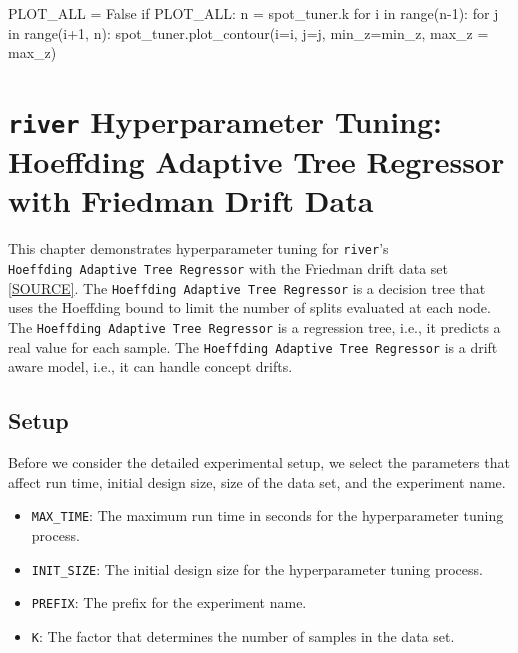\documentclass[
  letterpaper,
  DIV=11,
  numbers=noendperiod]{scrreprt}
\newenvironment{Shaded}{\begin{snugshade}}{\end{snugshade}}
\newcommand{\BuiltInTok}[1]{\textcolor[rgb]{0.00,0.23,0.31}{#1}}
\newcommand{\ControlFlowTok}[1]{\textcolor[rgb]{0.00,0.23,0.31}{#1}}
\newcommand{\DecValTok}[1]{\textcolor[rgb]{0.68,0.00,0.00}{#1}}
\newcommand{\KeywordTok}[1]{\textcolor[rgb]{0.00,0.23,0.31}{#1}}
\newcommand{\NormalTok}[1]{\textcolor[rgb]{0.00,0.23,0.31}{#1}}
\newcommand{\OperatorTok}[1]{\textcolor[rgb]{0.37,0.37,0.37}{#1}}
\newcommand{\VariableTok}[1]{\textcolor[rgb]{0.07,0.07,0.07}{#1}}
\providecommand{\tightlist}{%
  \setlength{\itemsep}{0pt}\setlength{\parskip}{0pt}}\usepackage{longtable,booktabs,array}
\begin{document}
\begin{Shaded}
\begin{Highlighting}[]
\NormalTok{PLOT\_ALL }\OperatorTok{=} \VariableTok{False}
\ControlFlowTok{if}\NormalTok{ PLOT\_ALL:}
\NormalTok{    n }\OperatorTok{=}\NormalTok{ spot\_tuner.k}
    \ControlFlowTok{for}\NormalTok{ i }\KeywordTok{in} \BuiltInTok{range}\NormalTok{(n}\OperatorTok{{-}}\DecValTok{1}\NormalTok{):}
        \ControlFlowTok{for}\NormalTok{ j }\KeywordTok{in} \BuiltInTok{range}\NormalTok{(i}\OperatorTok{+}\DecValTok{1}\NormalTok{, n):}
\NormalTok{            spot\_tuner.plot\_contour(i}\OperatorTok{=}\NormalTok{i, j}\OperatorTok{=}\NormalTok{j, min\_z}\OperatorTok{=}\NormalTok{min\_z, max\_z }\OperatorTok{=}\NormalTok{ max\_z)}
\end{Highlighting}
\end{Shaded}

\hypertarget{sec-river-hpt}{%
\chapter{\texorpdfstring{\texttt{river} Hyperparameter Tuning: Hoeffding
Adaptive Tree Regressor with Friedman Drift
Data}{river Hyperparameter Tuning: Hoeffding Adaptive Tree Regressor with Friedman Drift Data}}\label{sec-river-hpt}}

This chapter demonstrates hyperparameter tuning for \texttt{river}'s
\texttt{Hoeffding\ Adaptive\ Tree\ Regressor} with the Friedman drift
data set
\href{https://riverml.xyz/0.18.0/api/datasets/synth/FriedmanDrift/}{{[}SOURCE{]}}.
The \texttt{Hoeffding\ Adaptive\ Tree\ Regressor} is a decision tree
that uses the Hoeffding bound to limit the number of splits evaluated at
each node. The \texttt{Hoeffding\ Adaptive\ Tree\ Regressor} is a
regression tree, i.e., it predicts a real value for each sample. The
\texttt{Hoeffding\ Adaptive\ Tree\ Regressor} is a drift aware model,
i.e., it can handle concept drifts.

\hypertarget{sec-setup-13}{%
\section{Setup}\label{sec-setup-13}}

Before we consider the detailed experimental setup, we select the
parameters that affect run time, initial design size, size of the data
set, and the experiment name.

\begin{itemize}
\tightlist
\item
  \texttt{MAX\_TIME}: The maximum run time in seconds for the
  hyperparameter tuning process.
\item
  \texttt{INIT\_SIZE}: The initial design size for the hyperparameter
  tuning process.
\item
  \texttt{PREFIX}: The prefix for the experiment name.
\item
  \texttt{K}: The factor that determines the number of samples in the
  data set.
\end{itemize}
\end{document}
